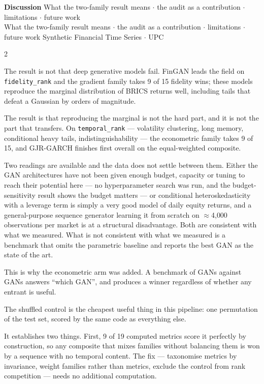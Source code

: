 \documentclass[10pt]{article}
\newcommand{\navybox}[2]{\begin{tcolorbox}[mybox={Navy}{LBg},title={#1}]#2\end{tcolorbox}}
\newcommand{\skybox}[2]{\begin{tcolorbox}[mybox={Sky}{BBg},title={#1}]#2\end{tcolorbox}}
\newcommand{\pagehead}[2]{%
  \begin{tcolorbox}[enhanced,arc=0pt,outer arc=0pt,boxrule=0pt,
    colback=Navy,colframe=Navy,
    top=5pt,bottom=5pt,left=8pt,right=8pt,
    before skip=0pt,after skip=10pt]
  {\color{white}\large\bfseries #1}%
  \ifx\relax#2\relax\else\\[1pt]{\color{blue!30!white}\small #2}\fi
  \hfill{\color{blue!20!white}\footnotesize Synthetic Financial Time Series $\cdot$ UPC}
  \end{tcolorbox}}
\begin{document}
\clearpage

\pagehead{Discussion}
         {What the two-family result means $\cdot$ the audit as a contribution $\cdot$ limitations $\cdot$ future work}

\begin{multicols}{2}

\navybox{A 6-Parameter Model Wins, and Why That Is the Interesting Part}{%
The result is not that deep generative models fail. FinGAN leads the field on \texttt{fidelity\_rank} and the gradient family takes 9 of 15 fidelity wins; these models reproduce the marginal distribution of BRICS returns well, including tails that defeat a Gaussian by orders of magnitude.

The result is that reproducing the marginal is not the hard part, and it is not the part that transfers. On \texttt{temporal\_rank} --- volatility clustering, long memory, conditional heavy tails, indistinguishability --- the econometric family takes 9 of 15, and GJR-GARCH finishes first overall on the equal-weighted composite.

Two readings are available and the data does not settle between them. Either the GAN architectures have not been given enough budget, capacity or tuning to reach their potential here --- no hyperparameter search was run, and the budget-sensitivity result shows the budget matters --- or conditional heteroskedasticity with a leverage term is simply a very good model of daily equity returns, and a general-purpose sequence generator learning it from scratch on $\approx$4{,}000 observations per market is at a structural disadvantage. Both are consistent with what we measured. What is not consistent with what we measured is a benchmark that omits the parametric baseline and reports the best GAN as the state of the art.

\smallskip
This is why the econometric arm was added. A benchmark of GANs against GANs answers ``which GAN'', and produces a winner regardless of whether any entrant is useful.}

\skybox{The Audit as a Methodological Contribution}{%
The shuffled control is the cheapest useful thing in this pipeline: one permutation of the test set, scored by the same code as everything else.

It establishes two things. First, 9 of 19 computed metrics score it perfectly by construction, so any composite that mixes families without balancing them is won by a sequence with no temporal content. The fix --- taxonomise metrics by invariance, weight families rather than metrics, exclude the control from rank competition --- needs no additional computation.

}
\end{multicols}
\end{document}
